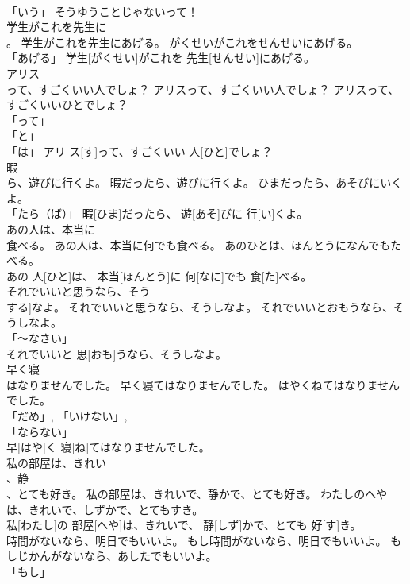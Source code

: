 \documentclass[8pt]{extreport}
\begin{document}
\begin{CJK}{UTF8}{min}
\\	「いう」	そうゆうことじゃないって！		
\\	学生がこれを先生に
\\	。	学生がこれを先生にあげる。	がくせいがこれをせんせいにあげる。	
\\	「あげる」	学生[がくせい]がこれを 先生[せんせい]にあげる。		
\\	アリス
\\	って、すごくいい人でしょ？	アリスって、すごくいい人でしょ？	アリスって、すごくいいひとでしょ？	
\\	「って」 
\\	「と」 
\\	「は」	アリ ス[す]って、すごくいい 人[ひと]でしょ？		
\\	暇
\\	ら、遊びに行くよ。	暇だったら、遊びに行くよ。	ひまだったら、あそびにいくよ。	
\\	「たら（ば）」	暇[ひま]だったら、 遊[あそ]びに 行[い]くよ。		
\\	あの人は、本当に
\\	食べる。	あの人は、本当に何でも食べる。	あのひとは、ほんとうになんでもたべる。	
\\	あの 人[ひと]は、 本当[ほんとう]に 何[なに]でも 食[た]べる。		
\\	それでいいと思うなら、そう
\\	する]なよ。	それでいいと思うなら、そうしなよ。	それでいいとおもうなら、そうしなよ。	
\\	「～なさい」 
\\	それでいいと 思[おも]うなら、そうしなよ。		
\\	早く寝
\\	はなりませんでした。	早く寝てはなりませんでした。	はやくねてはなりませんでした。	
\\	「だめ」, 「いけない」, 
\\	「ならない」 
\\	早[はや]く 寝[ね]てはなりませんでした。		
\\	私の部屋は、きれい
\\	、静
\\	、とても好き。	私の部屋は、きれいで、静かで、とても好き。	わたしのへやは、きれいで、しずかで、とてもすき。	
\\	私[わたし]の 部屋[へや]は、きれいで、 静[しず]かで、とても 好[す]き。		
\\	時間がないなら、明日でもいいよ。	もし時間がないなら、明日でもいいよ。	もしじかんがないなら、あしたでもいいよ。	
\\	「もし」 

\end{CJK}
\end{document}

